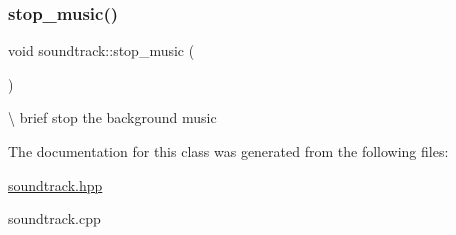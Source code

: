 \subsubsection{\texorpdfstring{stop\+\_\+music()}{stop\_music()}}
{\footnotesize\ttfamily void soundtrack\+::stop\+\_\+music (\begin{DoxyParamCaption}{ }\end{DoxyParamCaption})}

\textbackslash{} brief stop the background music 

The documentation for this class was generated from the following files\+:\begin{DoxyCompactItemize}
\item 
\hyperlink{soundtrack_8hpp}{soundtrack.\+hpp}\item 
soundtrack.\+cpp\end{DoxyCompactItemize}
